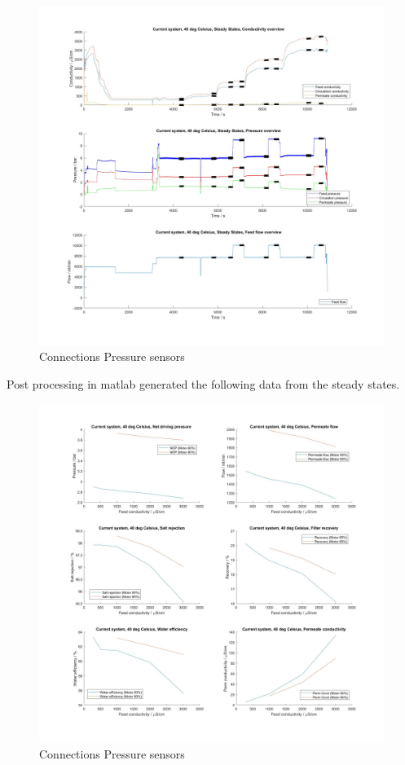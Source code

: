 \begin{figure}[H]
    \centering
    \includegraphics[width=1.1\textwidth]{overview40}
    \caption{Connections Pressure sensors}
    \label{fig:PressConn}
\end{figure}

\newpage

Post processing in matlab generated the following data from the steady states.

\begin{figure}[H]
    \centering
    \includegraphics[width=1.1\textwidth]{Key40}
    \caption{Connections Pressure sensors}
    \label{fig:PressConn}
\end{figure}

